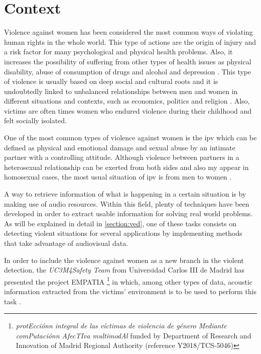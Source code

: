 \section{Context}

	Violence against women has been considered the most common ways of violating human rights in the whole world. This type of actions are the origin of injury and a risk factor for many psychological and physical health problems. Also, it increases the possibility of suffering from other types of health issues as physical disability, abuse of consumption of drugs and alcohol and depression \cite{Heise1999}\cite{Watts2002}. This type of violence is usually based on deep social and cultural roots and it is undoubtedly linked to unbalanced relationships between men and women in different situations and contexts, such as economics, politics and religion \cite{Blanco2004}. Also, victims are often times  women who endured violence during their childhood and felt socially isolated. %
	
	One of the most common types of violence against women is the \acrfull{ipv} which can be defined as physical and emotional damage and sexual abuse by an intimate partner with a controlling attitude. Although violence between partners in a heterosexual relationship can be exerted from both sides and also my appear in homosexual cases, the most usual situation of \acrshort{ipv} is from men to women \cite{WorldHealtOrganization2012}.

	A way to retrieve information of what is happening in a certain situation is by making use of audio resources. Within this field, plenty of techniques have been developed in order to extract usable information for solving real world problems. As will be explained in detail in \ref{section:ved}, one of these tasks consists on detecting violent situations for several applications by implementing methods that take advantage of audiovisual data.
	
	In order to include the violence against women as a new branch in the violent detection, the \textit{UC3M4Safety Team} from Universidad Carlos III de Madrid has presented the project EMPATIA \footnote{\textit{protEcciónn integral de las víctimas de violencia de género Mediante comPutaciónn AfecTIva multimodAl} funded by Department  of  Research  and Innovation of Madrid Regional Authority (reference  Y2018/TCS-5046)} in which, among other types of data, acoustic information extracted from the victims' environment is to be used to perform this task \cite{UC3M4SafetyTeam2018}.
	
